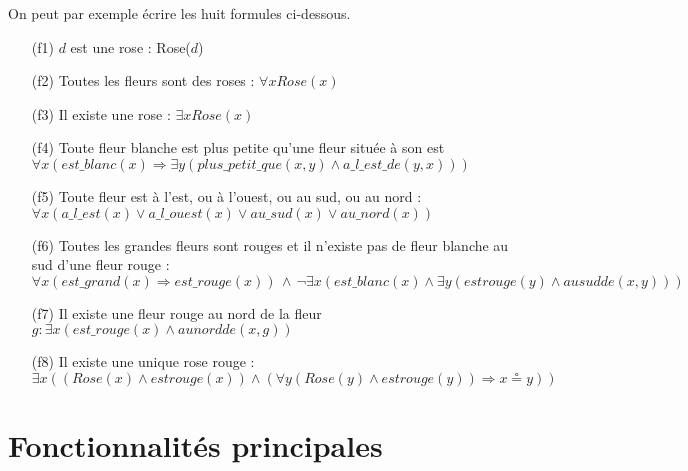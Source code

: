 \documentclass{article}
\theoremstyle{plain}
\theoremstyle{remark}
\begin{document}
On peut par exemple écrire les huit formules ci-dessous.
\begin{itemize}
    \item [(f1)] $d$ est une rose : Rose($d$)
    \item [(f2)] Toutes les fleurs sont des roses : $\forall x Rose(x)$
    \item [(f3)] Il existe une rose : $\exists x Rose(x)$
    \item [(f4)] Toute fleur blanche est plus petite qu'une fleur située à son est \\
$\forall x (est\_blanc(x) \Rightarrow \exists y  (plus\_petit\_que(x, y) \wedge a\_l\_est\_de(y, x)))$
    \item [(f5)] Toute fleur est à l'est, ou à l'ouest, ou au sud, ou au nord : \\
$\forall x (a\_l\_est(x) \vee a\_l\_ouest(x) \vee au\_sud(x) \vee au\_nord(x))$
    \item [(f6)] Toutes les grandes fleurs sont rouges et il n'existe pas de fleur blanche au sud d'une fleur rouge : \\
    $\forall x (est\_grand(x) \Rightarrow est\_rouge(x))\, \wedge \,\neg \exists x (est\_blanc(x) \wedge \exists y (est rouge(y) \wedge au sud de(x, y)))$
    \item [(f7)] Il existe une fleur rouge au nord de la fleur $g : \exists x (est\_rouge(x) \wedge au nord de(x, g))$
    \item [(f8)] Il existe une unique rose rouge : \\
    $\exists x ((Rose(x) \wedge est rouge(x)) \wedge (\forall y (Rose(y) \wedge est rouge(y)) \Rightarrow x \circeq y))$
\end{itemize}

\clearpage

\section{Fonctionnalités principales}
\end{document}
